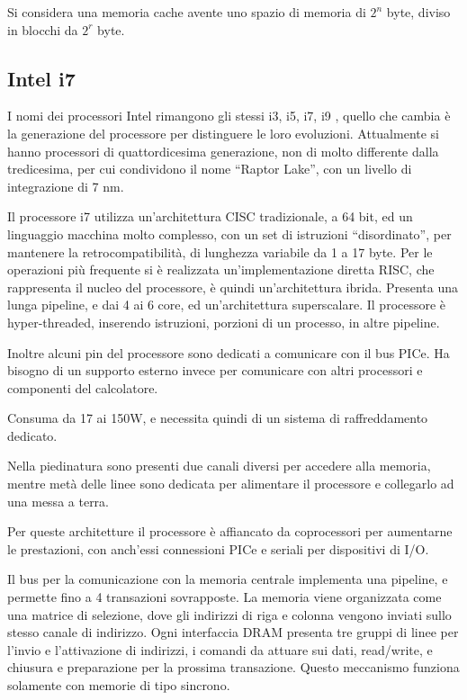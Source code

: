 \documentclass{article}
\numberwithin{equation}{subsection}
\begin{document}
Si considera una memoria cache avente uno spazio di memoria di $2^n$ byte, diviso in blocchi da $2^r$ byte. 


\subsection{Intel i7}

I nomi dei processori Intel rimangono gli stessi i3, i5, i7, i9 , quello che cambia è la generazione del processore per distinguere le loro evoluzioni. Attualmente si hanno 
processori di quattordicesima generazione, non di molto differente dalla tredicesima, per cui condividono il nome ``Raptor Lake'', con un livello di integrazione di 7 nm. 

Il processore i7 utilizza un'architettura CISC tradizionale, a 64 bit, ed un linguaggio macchina molto complesso, con un set di istruzioni ``disordinato'', per mantenere la 
retrocompatibilità, di lunghezza variabile da 1 a 17 byte. 
Per le operazioni più frequente si è realizzata un'implementazione diretta RISC, che rappresenta il nucleo del processore, è quindi un'architettura ibrida. Presenta una lunga 
pipeline, e dai 4 ai 6 core, ed un'architettura superscalare. 
Il processore è hyper-threaded, inserendo istruzioni, porzioni di un processo, in altre pipeline. 

Inoltre alcuni pin del processore sono dedicati a comunicare con il bus PICe. Ha bisogno di un supporto esterno invece per comunicare con altri processori e componenti del 
calcolatore. 

Consuma da 17 ai 150W, e necessita quindi di un sistema di raffreddamento dedicato. 


Nella piedinatura sono presenti due canali diversi per accedere alla memoria, mentre metà delle linee sono dedicata per alimentare il processore e collegarlo ad una messa a 
terra. 

Per queste architetture il processore è affiancato da coprocessori per aumentarne le prestazioni, con anch'essi connessioni PICe e seriali per dispositivi di I/O.  

Il bus per la comunicazione con la memoria centrale implementa una pipeline, e permette fino a 4 transazioni sovrapposte. 
La memoria viene organizzata come una matrice di selezione, dove gli indirizzi di riga e colonna vengono inviati sullo stesso canale di indirizzo. 
Ogni interfaccia DRAM presenta tre gruppi di linee per l'invio e l'attivazione di indirizzi, i comandi da attuare sui dati, read/write, e chiusura e preparazione per la 
prossima transazione. Questo meccanismo funziona solamente con memorie di tipo sincrono. 
\end{document}
